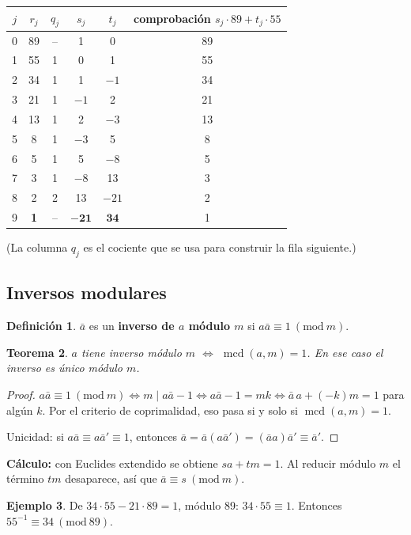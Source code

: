 \documentclass[11pt,a4paper]{article}
\newtheorem{teorema}{Teorema}[section]
\theoremstyle{definition}
\newtheorem{definicion}[teorema]{Definición}
\newtheorem{ejemplo}[teorema]{Ejemplo}
\newcommand{\md}[1]{\ (\mathrm{mod}\ #1)}
\newcommand{\mcd}{\operatorname{mcd}}
\theoremstyle{notait}
\theoremstyle{nota}
\begin{document}
\begin{center}
\begin{tabular}{cccccc}
\toprule
$j$ & $r_j$ & $q_j$ & $s_j$ & $t_j$ & comprobación $s_j\cdot89+t_j\cdot55$\\
\midrule
0 & 89 & -- & 1 & 0 & 89\\
1 & 55 & 1 & 0 & 1 & 55\\
2 & 34 & 1 & 1 & $-1$ & 34\\
3 & 21 & 1 & $-1$ & 2 & 21\\
4 & 13 & 1 & 2 & $-3$ & 13\\
5 & 8 & 1 & $-3$ & 5 & 8\\
6 & 5 & 1 & 5 & $-8$ & 5\\
7 & 3 & 1 & $-8$ & 13 & 3\\
8 & 2 & 2 & 13 & $-21$ & 2\\
9 & \textbf{1} & -- & $\mathbf{-21}$ & $\mathbf{34}$ & 1\\
\bottomrule
\end{tabular}
\end{center}
(La columna $q_j$ es el cociente que se usa para construir la fila siguiente.)

\subsection{Inversos modulares}

\begin{definicion}
$\bar a$ es un \textbf{inverso de $a$ módulo $m$} si $a\bar a\equiv 1\md m$.
\end{definicion}

\begin{teorema}
$a$ tiene inverso módulo $m$ $\iff$ $\mcd(a,m)=1$. En ese caso el inverso es único módulo $m$.
\end{teorema}
\begin{proof}
$a\bar a\equiv1\md m\iff m\mid a\bar a-1\iff a\bar a-1=mk\iff \bar a\, a+(-k)m=1$ para algún $k$. Por el criterio de coprimalidad, eso pasa si y solo si $\mcd(a,m)=1$.

Unicidad: si $a\bar a\equiv a\bar a'\equiv1$, entonces $\bar a=\bar a(a\bar a')=(\bar a a)\bar a'\equiv\bar a'$.
\end{proof}

\textbf{Cálculo:} con Euclides extendido se obtiene $sa+tm=1$. Al reducir módulo $m$ el término $tm$ desaparece, así que $\bar a\equiv s\md m$.

\begin{ejemplo}
De $34\cdot55-21\cdot89=1$, módulo 89: $34\cdot55\equiv1$. Entonces $55^{-1}\equiv34\md{89}$.
\end{ejemplo}
\end{document}
